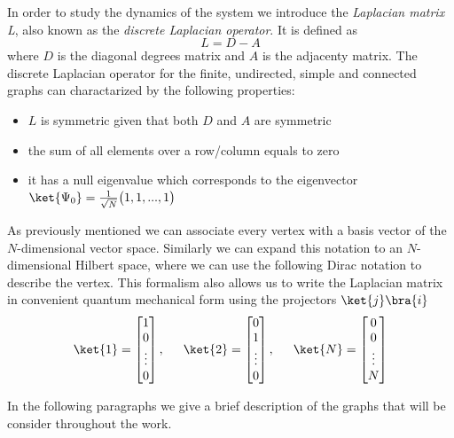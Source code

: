 In order to study the dynamics of the system we introduce the \textit{Laplacian matrix L}, also known as the \textit{discrete Laplacian operator}. It is defined as
\begin{equation}
    L = D-A
\end{equation}
where $D$ is the diagonal degrees matrix and $A$ is the adjacenty matrix. The discrete Laplacian operator for the finite, undirected, simple and connected graphs can charactarized by the following properties:
\begin{itemize}
  \item $L$ is symmetric given that both $D$ and $A$ are symmetric
  \item the sum of all elements over a row/column equals to zero
  \item it has a null eigenvalue which corresponds to the eigenvector $\ket{\Psi_0} = \frac{1}{\sqrt{N}}\big(1,1,...,1\big)$
\end{itemize}
As previously mentioned we can associate every vertex with a basis vector of the $N$-dimensional vector space. Similarly we can expand this notation to an $N$-dimensional Hilbert space, where we can use the following Dirac notation to describe the vertex. This formalism also allows us to write the Laplacian matrix in convenient quantum mechanical form using the projectors $\ket{j}\bra{i}$
\begin{equation}
  \ket{1}=\begin{bmatrix} 1 \\ 0 \\ \vdots \\ 0\end{bmatrix}, \hspace{15pt}\ket{2}=\begin{bmatrix}0\\1\\\vdots\\0\end{bmatrix}, \hspace{15pt}\ket{N}=\begin{bmatrix}0\\0\\\vdots\\N\end{bmatrix}
\end{equation}


In the following paragraphs we give a brief description of the graphs that will be consider throughout the work. \\
  \vspace{-0.5cm}
